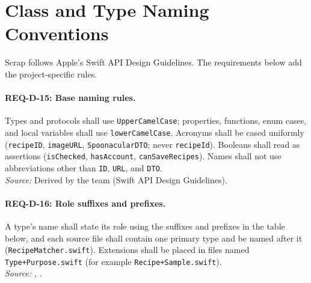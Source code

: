 \section{Class and Type Naming Conventions}

Scrap follows Apple's Swift API Design Guidelines. The requirements below add the project-specific rules.

\paragraph{REQ-D-15: Base naming rules.}
 Types and protocols shall use \texttt{UpperCamelCase}; properties, functions, enum cases, and local variables shall use \texttt{lowerCamelCase}. Acronyms shall be cased uniformly (\texttt{recipeID}, \texttt{imageURL}, \texttt{SpoonacularDTO}; never \texttt{recipeId}). Booleans shall read as assertions (\texttt{isChecked}, \texttt{hasAccount}, \texttt{canSaveRecipes}). Names shall not use abbreviations other than \texttt{ID}, \texttt{URL}, and \texttt{DTO}.\\
\textit{Source:} Derived by the team (Swift API Design Guidelines).

\paragraph{REQ-D-16: Role suffixes and prefixes.}
 A type's name shall state its role using the suffixes and prefixes in the table below, and each source file shall contain one primary type and be named after it (\texttt{RecipeMatcher.swift}). Extensions shall be placed in files named \texttt{Type+Purpose.swift} (for example \texttt{Recipe+Sample.swift}).\\
\textit{Source:} , .

